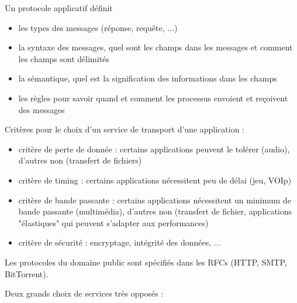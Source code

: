 		Un protocole applicatif définit
		
		\begin{itemize}
			\item les types des messages (réponse, requête, ...)
			\item la syntaxe des messages, quel sont les champs dans les messages et comment les champs sont délimités
			\item la sémantique, quel est la signification des informations dans les champs
			\item les règles pour savoir quand et comment les processus envoient et reçoivent des messages
		\end{itemize}
		
		Critères pour le choix d'un service de transport d'une application :
		
		\begin{itemize}
			\item critère de perte de donnée : certains applications peuvent le tolérer (audio), d'autres non (transfert de fichiers)
			\item critère de timing : certains applications nécessitent peu de délai (jeu, VOIp)
			\item critère de bande passante : certains applications nécessitent un minimum de bande passante (multimédia), d'autres non (transfert de fichier, applications "élastiques" qui peuvent s'adapter aux performances)
			\item critère de sécurité : encryptage, intégrité des données, ...
		\end{itemize}
	
		Les protocoles du domaine public sont spécifiés dans les RFCs (HTTP, SMTP, BitTorrent).
		
		Deux grands choix de services très opposés :
		
